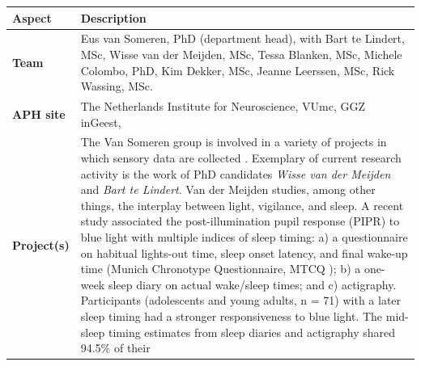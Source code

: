 \documentclass[]{book}
\begin{document}
\begin{longtable}[]{@{}ll@{}}
\toprule
\begin{minipage}[b]{0.25\columnwidth}\raggedright\strut
\textbf{Aspect}\strut
\end{minipage} & \begin{minipage}[b]{0.69\columnwidth}\raggedright\strut
\textbf{Description}\strut
\end{minipage}\tabularnewline
\midrule
\endhead
\begin{minipage}[t]{0.25\columnwidth}\raggedright\strut
\textbf{Team}\strut
\end{minipage} & \begin{minipage}[t]{0.69\columnwidth}\raggedright\strut
Eus van Someren, PhD (department head), with Bart te Lindert, MSc, Wisse
van der Meijden, MSc, Tessa Blanken, MSc, Michele Colombo, PhD, Kim
Dekker, MSc, Jeanne Leerssen, MSc, Rick Wassing, MSc.\strut
\end{minipage}\tabularnewline
\begin{minipage}[t]{0.25\columnwidth}\raggedright\strut
\textbf{APH site}\strut
\end{minipage} & \begin{minipage}[t]{0.69\columnwidth}\raggedright\strut
The Netherlands Institute for Neuroscience, VUmc, GGZ inGeest,\strut
\end{minipage}\tabularnewline
\begin{minipage}[t]{0.25\columnwidth}\raggedright\strut
\textbf{Project(s)}\strut
\end{minipage} & \begin{minipage}[t]{0.69\columnwidth}\raggedright\strut
The Van Someren group is involved in a variety of projects in which
sensory data are collected \citep[see,
e.g.,][\citet{VanSomeren2000}]{VanSomeren2011}. Exemplary of current
research activity is the work of PhD candidates \emph{Wisse van der
Meijden} and \emph{Bart te Lindert}. Van der Meijden studies, among
other things, the interplay between light, vigilance, and sleep. A
recent study associated the post-illumination pupil response (PIPR) to
blue light with multiple indices of sleep timing: a) a questionnaire on
habitual lights-out time, sleep onset latency, and final wake-up time
(Munich Chronotype Questionnaire, MTCQ \citep{Roenneberg2003}); b) a
one-week sleep diary on actual wake/sleep times; and c) actigraphy.
Participants (adolescents and young adults, n = 71) with a later sleep
timing had a stronger responsiveness to blue light. The mid-sleep timing
estimates from sleep diaries and actigraphy shared 94.5\% of their

\end{minipage}
\end{longtable}
\end{document}

